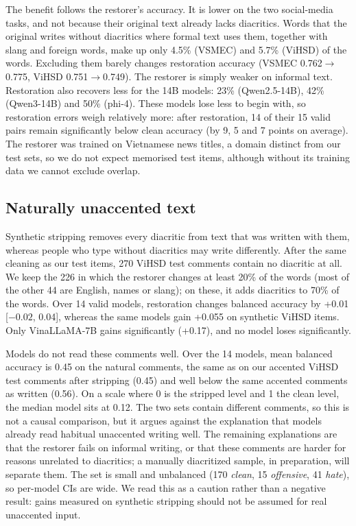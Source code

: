 \documentclass[conference]{IEEEtran}
\begin{document}
The benefit follows the restorer's accuracy. It is lower on the two social-media tasks, and not because their original text already lacks diacritics. Words that the original writes without diacritics where formal text uses them, together with slang and foreign words, make up only 4.5\% (VSMEC) and 5.7\% (ViHSD) of the words. Excluding them barely changes restoration accuracy (VSMEC 0.762$\rightarrow$0.775, ViHSD 0.751$\rightarrow$0.749). The restorer is simply weaker on informal text. Restoration also recovers less for the 14B models: 23\% (Qwen2.5-14B), 42\% (Qwen3-14B) and 50\% (phi-4). These models lose less to begin with, so restoration errors weigh relatively more: after restoration, 14 of their 15 valid pairs remain significantly below clean accuracy (by 9, 5 and 7 points on average). The restorer was trained on Vietnamese news titles, a domain distinct from our test sets, so we do not expect memorised test items, although without its training data we cannot exclude overlap.

\subsection{Naturally unaccented text}
Synthetic stripping removes every diacritic from text that was written with them, whereas people who type without diacritics may write differently. After the same cleaning as our test items, 270 ViHSD test comments contain no diacritic at all. We keep the 226 in which the restorer changes at least 20\% of the words (most of the other 44 are English, names or slang); on these, it adds diacritics to 70\% of the words. Over 14 valid models, restoration changes balanced accuracy by +0.01 [$-0.02$, 0.04], whereas the same models gain +0.055 on synthetic ViHSD items. Only VinaLLaMA-7B gains significantly (+0.17), and no model loses significantly.

Models do not read these comments well. Over the 14 models, mean balanced accuracy is 0.45 on the natural comments, the same as on our accented ViHSD test comments after stripping (0.45) and well below the same accented comments as written (0.56). On a scale where 0 is the stripped level and 1 the clean level, the median model sits at 0.12. The two sets contain different comments, so this is not a causal comparison, but it argues against the explanation that models already read habitual unaccented writing well. The remaining explanations are that the restorer fails on informal writing, or that these comments are harder for reasons unrelated to diacritics; a manually diacritized sample, in preparation, will separate them. The set is small and unbalanced (170 \textit{clean}, 15 \textit{offensive}, 41 \textit{hate}), so per-model CIs are wide. We read this as a caution rather than a negative result: gains measured on synthetic stripping should not be assumed for real unaccented input.
\end{document}
